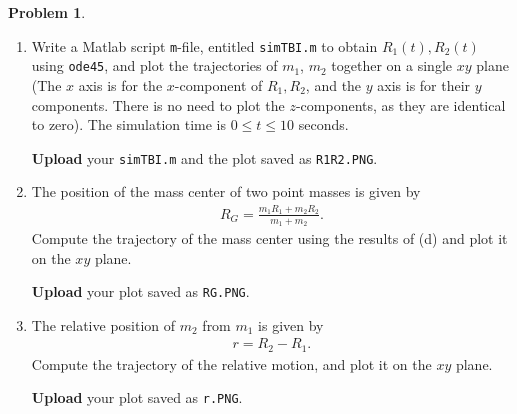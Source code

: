 \documentclass[10pt]{article}
\renewcommand{\baselinestretch}{1.2}
\theoremstyle{definition}
\newtheorem{prob}{Problem}[section]
\newenvironment{subprob}%
{\renewcommand{\theenumi}{\alph{enumi}}\renewcommand{\labelenumi}{(\theenumi)}\begin{enumerate}}%
{\end{enumerate}}%
\newenvironment{matlab}
{\begin{alltt}\small\renewcommand{\baselinestretch}{1.2}\selectfont}%
{\end{alltt}}
\begin{document}
\begin{prob}
\begin{subprob}
(You may verify the Matlab function \texttt{eomTBI.m} by checking its output when $t=0$. Type the following Matlab commands
\begin{matlab}
R10=[0 0 0]';
R20=[1 0 0]';
V10=[0 0 0]';
V20=[1 1 0]';
X0=[R10; V10; R20; V20];
eomTBI(0,X0)
\end{matlab}
And, check that the results are given by
\begin{matlab}
ans =
     0
     0
     0
     1
     0
     0
     1
     1
     0
    -2
     0
     0
\end{matlab}
If the output of \texttt{eomTBI} is different from above, go back to part (b) and fix your code. You don't have to submit anything for this verification. )

\item Write a Matlab script \texttt{m}-file, entitled \texttt{simTBI.m} to obtain $R_1(t), R_2(t)$ using \texttt{ode45}, and plot the trajectories of $m_1$, $m_2$ together on a single $xy$ plane (The $x$ axis is for the $x$-component of $R_1,R_2$, and the $y$ axis is for their $y$ components. There is no need to plot the $z$-components, as they are identical to zero). The simulation time is $0\leq t \leq 10$ seconds.

\textbf{Upload} your \texttt{simTBI.m} and the plot saved as \texttt{R1R2.PNG}.


\item The position of the mass center of two point masses is given by
\begin{align*}
 R_G = \frac{m_1  R_1 + m_2  R_2}{m_1+m_2}.
\end{align*}
Compute the trajectory of the mass center using the results of (d) and plot it on the $xy$ plane.

\textbf{Upload} your plot saved as \texttt{RG.PNG}.

\item The relative position of $m_2$ from $m_1$ is given by
\begin{align*}
 r =  R_2 - R_1.
\end{align*}
Compute the trajectory of the relative motion, and plot it on the $xy$ plane.

\textbf{Upload} your plot saved as \texttt{r.PNG}.
\end{subprob}
\end{prob}
\end{document}
